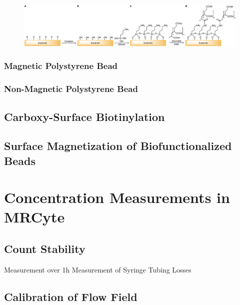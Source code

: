 \begin{figure}[htb!]
	\centering
	\includegraphics[width=1\linewidth]{Ressources/Chemistry/Substrate}
	\label{fig:chem:func:substrate}
\end{figure}



\subsubsection{Magnetic Polystyrene Bead}
\cleardoubleemptypage
\subsubsection{Non-Magnetic Polystyrene Bead}
\cleardoubleemptypage
\subsection{Carboxy-Surface Biotinylation}

\subsection{Surface Magnetization of Biofunctionalized Beads}


\section{Concentration Measurements in MRCyte}

\subsection{Count Stability}
Measurement over 1h
Measurement of Syringe Tubing Losses

\subsection{Calibration of Flow Field}

